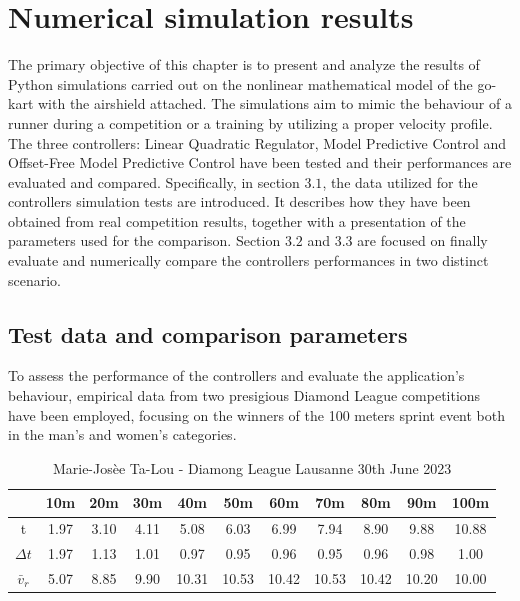 \documentclass[a4paper,12pt,oneside]{book}
\begin{document}
\chapter{Numerical simulation results}
\label{chapter:Simulations_results}
The primary objective of this chapter is to present and analyze the results of Python simulations carried out on the nonlinear mathematical model of the go-kart with the airshield attached.
The simulations aim to mimic the behaviour of a runner during a competition or a training by utilizing a proper velocity profile.
The three controllers: Linear Quadratic Regulator, Model Predictive Control and Offset-Free Model Predictive Control have been tested and their performances are evaluated and compared.
Specifically, in section $3.1$, the data utilized for the controllers simulation tests are introduced.
It describes how they have been obtained from real competition results, together with a presentation of the parameters used for the comparison.
Section $3.2$ and $3.3$ are focused on finally evaluate and numerically compare the controllers performances in two distinct scenario.

\section{Test data and comparison parameters}
To assess the performance of the controllers and evaluate the application's behaviour, empirical data from two presigious Diamond League competitions \cite{diamondleague} have been employed, focusing on the winners of the 100 meters sprint event both in the man's and women's categories. 

\begin{table}[h!]
	\centering
	\begin{adjustbox}{max width=\textwidth}
	\begin{tabular}{c|c|c|c|c|c|c|c|c|c|c}
           & 10m & 20m & 30m & 40m & 50m & 60m & 70m & 80m & 90m &100m \\
	\hline
	\hline
	t & 1.97 & 3.10 & 4.11 & 5.08 & 6.03 & 6.99 & 7.94 & 8.90 & 9.88 & 10.88  \\	
	$\Delta t$ & 1.97 & 1.13 & 1.01 & 0.97 & 0.95 & 0.96 & 0.95 & 0.96 & 0.98 & 1.00 \\
	$\bar{v}_r$ & 5.07 & 8.85 & 9.90 & 10.31 & 10.53 & 10.42 & 10.53 & 10.42 & 10.20 & 10.00 \\
	\hline
	\end{tabular}
	\end{adjustbox}
\caption{Marie-Josèe Ta-Lou - Diamong League Lausanne 30th June 2023}
\label{tab:Women}
\end{table}
\end{document}
